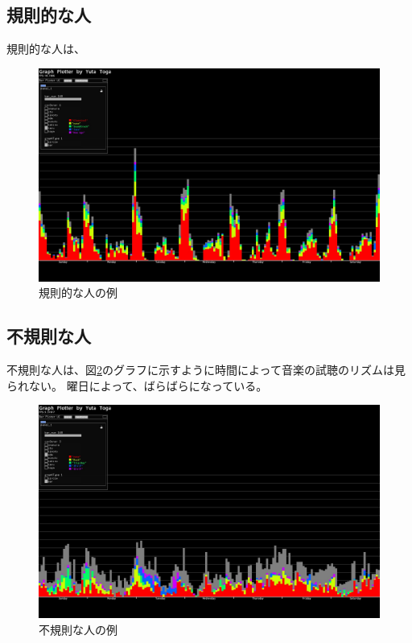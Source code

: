 \documentclass{jsarticle}
\begin{document}
\subsection{規則的な人}
規則的な人は、
\begin{figure}[h]
\begin{center}
\includegraphics[width=14cm]{sample_regular.jpg}
\caption{規則的な人の例}
\label{sample_regular}
\end{center}
\end{figure}


\subsection{不規則な人}
不規則な人は、図\ref{sample_irregular}のグラフに示すように時間によって音楽の試聴のリズムは見られない。
曜日によって、ばらばらになっている。

\begin{figure}[h]
\begin{center}
\includegraphics[width=14cm]{sample_irregular.jpg}
\caption{不規則な人の例}
\label{sample_irregular}
\end{center}
\end{figure}
\end{document}

